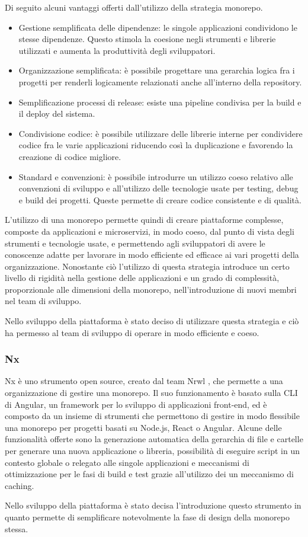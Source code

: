 Di seguito alcuni vantaggi offerti dall'utilizzo della strategia monorepo.\cite{Monorepo}
\begin{itemize}
      \itemsep0em
      \item Gestione semplificata delle dipendenze: le singole applicazioni condividono le stesse dipendenze.
            Questo stimola la coesione negli strumenti e librerie utilizzati e
            aumenta la produttività degli sviluppatori.
      \item Organizzazione semplificata: è possibile progettare una
            gerarchia logica fra i progetti per renderli logicamente
            relazionati anche all'interno della repository.
      \item Semplificazione processi di release: esiste una pipeline condivisa per la build e il deploy del sistema.
      \item Condivisione codice: è possibile utilizzare delle librerie interne per condividere codice fra le varie applicazioni riducendo
            così la duplicazione e favorendo la creazione di codice migliore.
      \item Standard e convenzioni: è possibile introdurre un utilizzo coeso relativo alle convenzioni di sviluppo e all'utilizzo delle tecnologie
            usate per testing, debug e build dei progetti. Queste permette di creare codice consistente e di qualità.

\end{itemize}
L'utilizzo di una monorepo permette quindi di creare piattaforme complesse, composte da applicazioni e microservizi, in modo
coeso, dal punto di vista degli strumenti e tecnologie usate, e permettendo agli sviluppatori di avere le conoscenze adatte per lavorare
in modo efficiente ed efficace ai vari progetti della organizzazione.
Nonostante ciò l'utilizzo di questa strategia introduce un certo livello di rigidità nella gestione delle applicazioni e un
grado di complessità, proporzionale alle dimensioni della monorepo, nell'introduzione di nuovi membri nel team di sviluppo.

Nello sviluppo della piattaforma è stato deciso di utilizzare questa strategia e ciò ha permesso
al team di sviluppo di operare in modo efficiente e coeso.

\subsubsection{Nx}
Nx \cite{Nx} è uno strumento open source, creato dal team Nrwl \cite{Nrwl}, che permette a una organizzazione
di gestire una monorepo.
Il suo funzionamento è basato sulla CLI di Angular, un framework per lo sviluppo di applicazioni front-end,
ed è composto da un insieme di strumenti che permettono di gestire in modo flessibile una monorepo per progetti basati
su Node.js, React o Angular. Alcune delle funzionalità offerte sono la generazione automatica della gerarchia di file e cartelle
per generare una nuova applicazione o libreria, possibilità di eseguire script in un contesto globale o relegato alle singole applicazioni
e meccanismi di ottimizzazione per le fasi di build e test grazie all'utilizzo dei un meccanismo di caching.

Nello sviluppo della piattaforma è stato decisa l'introduzione questo strumento in quanto permette di semplificare
notevolmente la fase di design della monorepo stessa.